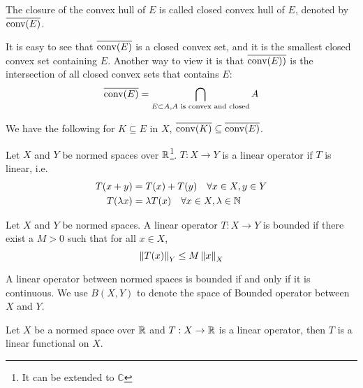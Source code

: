 \begin{definition}
   The closure of the convex hull of $E$ is called closed convex hull of $E$,
   denoted by $\overline{\textnormal{conv}(E)}$.
\end{definition}

It is easy to see that $\overline{\textnormal{conv}(E)}$ is a closed convex set, and it is
the smallest closed convex set containing $E$. Another way to view it is that
$\overline{\textnormal{conv}(E))}$ is the intersection of all closed convex sets that
contains $E$:
\begin{equation}
   \overline{\textnormal{conv}(E)} = \bigcap_{E \subset A, A \text{ is convex and closed}} A   
\end{equation}

We have the following for $K \subseteq E$ in $X$, $\overline{\textnormal{conv}(K)} \subseteq
\overline{\textnormal{conv}(E)}$.





\begin{definition}
   Let $X$ and $Y$ be normed spaces over $\mathbb{R}$\footnote{
       It can be extended to $\mathbb{C}$
   }. $T: X \to Y$ is a linear operator if $T$ is linear, i.e.
   \begin{align*}
      T(x+y)       &= T(x) + T(y) \quad \forall x \in X, y \in Y \\
      T(\lambda x) &= \lambda T(x) \quad \forall x \in X, \lambda \in \mathbb{N}
   \end{align*}
\end{definition}

\begin{definition}
   Let $X$ and $Y$ be normed spaces. A linear operator $T: X \to Y$ is bounded
   if there exist a $M > 0$ such that for all $x \in X$,
   \begin{equation*}
      \left\| T(x) \right\|_{Y} \leq M \left\| x \right\|_{X}
   \end{equation*}
\end{definition}

A linear operator between normed spaces is bounded if and only if it is
continuous. We use $B(X, Y)$ to denote the space of Bounded operator between $X$
and $Y$.

\begin{definition}
   Let $X$ be a normed space over $\mathbb{R}$ and $T: X \to \mathbb{R}$ is a linear operator,
   then $T$ is a linear functional on $X$.
\end{definition}

